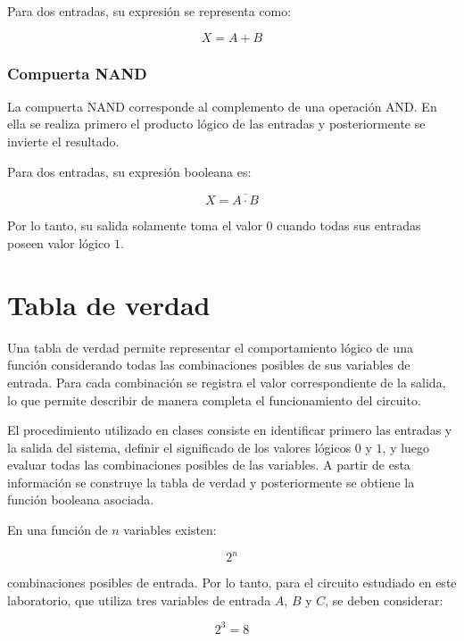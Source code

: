 \documentclass[12pt]{report}
\begin{document}
Para dos entradas, su expresión se representa como:

\begin{equation}
    X = A + B
\end{equation}

\subsubsection{Compuerta NAND}

La compuerta NAND corresponde al complemento de una operación AND. En ella se realiza
primero el producto lógico de las entradas y posteriormente se invierte el resultado.

Para dos entradas, su expresión booleana es:

\begin{equation}
    X = \overline{A \cdot B}
\end{equation}

Por lo tanto, su salida solamente toma el valor $0$ cuando todas sus entradas poseen
valor lógico $1$.



\section{Tabla de verdad}


Una tabla de verdad permite representar el comportamiento lógico de una función considerando todas las combinaciones posibles de sus variables de entrada. Para cada combinación se registra el valor correspondiente de la salida, lo que permite describir de manera completa el funcionamiento del circuito.

El procedimiento utilizado en clases consiste en identificar primero las entradas y la salida del sistema, definir el significado de los valores lógicos $0$ y $1$, y luego evaluar todas las combinaciones posibles de las variables. A partir de esta información se construye la tabla de verdad y posteriormente se obtiene la función booleana asociada.


En una función de $n$ variables existen:

\begin{equation}
    2^n
\end{equation}

combinaciones posibles de entrada. Por lo tanto, para el circuito estudiado en este
laboratorio, que utiliza tres variables de entrada $A$, $B$ y $C$, se deben considerar:

\begin{equation}
    2^3 = 8
\end{equation}
\end{document}
